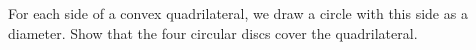 For each side of a convex quadrilateral, we draw a circle with this side as a diameter. Show that the four circular discs cover the quadrilateral.
